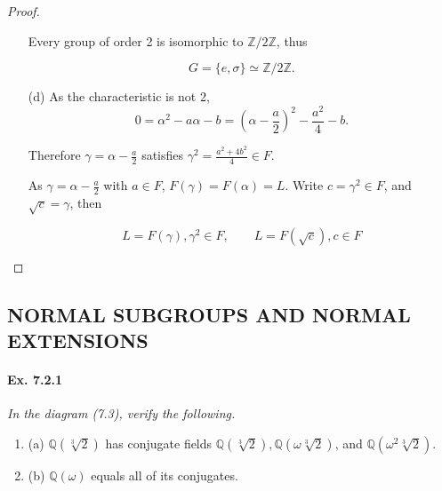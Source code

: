 \documentclass[11pt,a4paper]{article}
\newcommand{\be} {\begin{enumerate}}
\newcommand{\ee} {\end{enumerate}}
\newcommand{\Q}{\mathbb{Q}}
\newcommand{\Z}{\mathbb{Z}}
\begin{document}
\begin{proof}
\begin{enumerate}
Every group of order 2 is isomorphic to  $\Z/2\Z$, thus

$$G = \{e,\sigma\} \simeq \Z/2\Z.$$


\item[(d)]
As the characteristic is not 2,
$$0 = \alpha^2 - a\alpha - b = \left(\alpha - \frac{a}{2}\right)^2 -\frac{a^2}{4} - b.$$

Therefore $\gamma = \alpha - \frac{a}{2}$ satisfies $\gamma^2 = \frac{a^2+4b^2}{4} \in F$.

As $\gamma = \alpha - \frac{a}{2}$ with  $a\in F$,  $F(\gamma) =F(\alpha) = L$. Write $c = \gamma^2 \in F$, and $\sqrt{c} = \gamma$, then

$$L = F(\gamma), \gamma^2 \in F , \qquad  L = F(\sqrt{c}) , c \in F$$
\end{enumerate}
\end{proof}

\subsection{NORMAL SUBGROUPS AND NORMAL EXTENSIONS}

\paragraph{Ex. 7.2.1}

{\it In the diagram (7.3), verify the following.
\be
\item[(a)] $\Q(\sqrt[3]{2})$ has conjugate fields $\Q(\sqrt[3]{2}),\Q(\omega \sqrt[3]{2})$, and $\Q(\omega^2 \sqrt[3]{2})$.
\item[(b)] $\Q(\omega)$ equals all of its conjugates.
\ee
}
\end{document}
